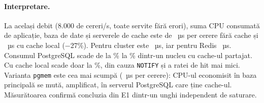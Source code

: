 \paragraph{Interpretare.} La același debit (8.000 de cereri/s, toate servite fără erori), suma CPU consumată
de aplicație, baza de date și serverele de cache este de ~µs per cerere fără cache și
~µs cu cache local ($-$27\%). Pentru cluster este ~µs, iar pentru Redis
~µs. Consumul PostgreSQL scade de la \% la \% dintr-un nucleu
cu cache-ul partajat. Cu cache local scade doar la \%, din cauza \texttt{NOTIFY} și a ratei de hit
mai mici. Varianta \texttt{pgmem} este cea mai scumpă (~µs per cerere): CPU-ul economisit în
baza principală se mută, amplificat, în serverul PostgreSQL care ține cache-ul. Măsurătoarea confirmă
concluzia din E1 dintr-un unghi independent de saturare.
